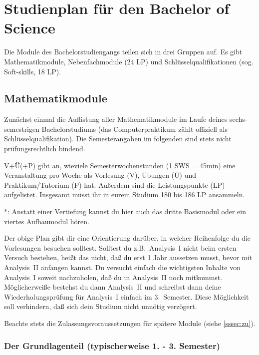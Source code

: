 \section{Studienplan für den Bachelor of Science}

Die Module des Bachelorstudiengangs
teilen sich in drei Gruppen auf.
Es gibt Mathematikmodule, Nebenfachmodule (24 LP)
und Schlüsselqualifikationen (sog. \glqq Soft-skills\grqq, 18 LP).

\subsection{Mathematikmodule}
Zunächst einmal die Auflistung aller Mathematikmodule
im Laufe deines sechs-semestrigen Bachelorstudiums
(das Computerpraktikum zählt offiziell als Schlüsselqualifikation).
Die Semesterangaben im folgenden sind stets
nicht prüfungsrechtlich bindend.

\vspace*{-0.5cm}



V+Ü(+P) gibt an, wieviele Semesterwochenstunden (1 SWS = 45min)
eine Veranstaltung pro Woche als Vorlesung (V), Übungen (Ü)
und Praktikum/Tutorium (P) hat.
Außerdem sind die Leistungspunkte (LP) aufgelistet.
Insgesamt müsst ihr in eurem Studium 180 bis 186 LP ansammeln.

*: Anstatt einer Vertiefung kannst du hier auch das dritte Basismodul
oder ein viertes Aufbaumodul hören.

Der obige Plan gibt dir eine Orientierung darüber,
in welcher Reihenfolge du die Vorlesungen besuchen solltest.
Solltest du z.B.\ Analysis~I nicht beim ersten Versuch bestehen,
heißt das nicht, daß du erst 1 Jahr aussetzen musst,
bevor mit Analysis~II anfangen kannst.
Du versucht einfach die wichtigsten Inhalte von Analysis~I
soweit nachzuholen, daß du in Analysis~II noch mitkommst.
Möglicherweiße bestehst du dann Analysis~II
und schreibst dann deine Wiederholungsprüfung
für Analysis~I einfach im 3.~Semester.
Diese Möglichkeit soll verhindern,
daß sich dein Studium nicht unnötig verzögert.

Beachte stets die Zulassungsvoraussetzungen
für spätere Module (siehe \ref{sssec:zu}).

\subsubsection{Der Grundlagenteil (typischerweise 1. - 3. Semester)}

